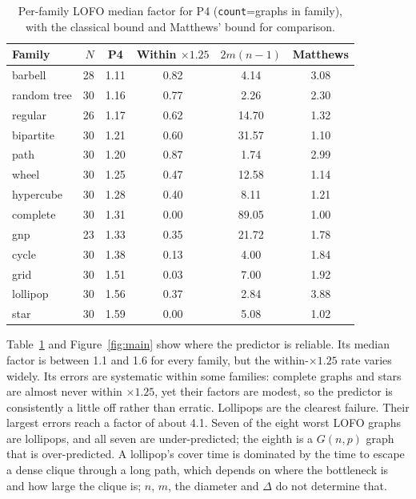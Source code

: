 \documentclass{article}
\begin{document}
\begin{table}[t]
\caption{Per-family LOFO median factor for P4 (\texttt{count}=graphs in family), with the classical bound and Matthews' bound for comparison.}
\label{tab:family}
\begin{center}
\small
\begin{tabular}{lrcccc}
\toprule
Family & $N$ & P4 & Within $\times1.25$ & $2m(n-1)$ & Matthews \\
\midrule
barbell & 28 & 1.11 & 0.82 & 4.14 & 3.08 \\
random tree & 30 & 1.16 & 0.77 & 2.26 & 2.30 \\
regular & 26 & 1.17 & 0.62 & 14.70 & 1.32 \\
bipartite & 30 & 1.21 & 0.60 & 31.57 & 1.10 \\
path & 30 & 1.20 & 0.87 & 1.74 & 2.99 \\
wheel & 30 & 1.25 & 0.47 & 12.58 & 1.14 \\
hypercube & 30 & 1.28 & 0.40 & 8.11 & 1.21 \\
complete & 30 & 1.31 & 0.00 & 89.05 & 1.00 \\
gnp & 23 & 1.33 & 0.35 & 21.72 & 1.78 \\
cycle & 30 & 1.38 & 0.13 & 4.00 & 1.84 \\
grid & 30 & 1.51 & 0.03 & 7.00 & 1.92 \\
lollipop & 30 & 1.56 & 0.37 & 2.84 & 3.88 \\
star & 30 & 1.59 & 0.00 & 5.08 & 1.02 \\
\bottomrule
\end{tabular}
\end{center}
\vskip -0.1in
\end{table}

Table~\ref{tab:family} and Figure~\ref{fig:main} show where the predictor is reliable. Its median factor is between 1.1 and 1.6 for every family, but the within-$\times1.25$ rate varies widely. Its errors are systematic within some families: complete graphs and stars are almost never within $\times1.25$, yet their factors are modest, so the predictor is consistently a little off rather than erratic. Lollipops are the clearest failure. Their largest errors reach a factor of about 4.1. Seven of the eight worst LOFO graphs are lollipops, and all seven are under-predicted; the eighth is a $G(n,p)$ graph that is over-predicted. A lollipop's cover time is dominated by the time to escape a dense clique through a long path, which depends on where the bottleneck is and how large the clique is; $n$, $m$, the diameter and $\Delta$ do not determine that.
\end{document}
